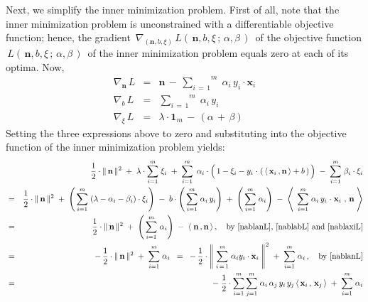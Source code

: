 Next, we simplify the inner minimization problem.
First of all, note that the inner minimization problem is unconstrained
with a differentiable objective function; hence, the gradient 
\,$\nabla_{(\mathbf{n},b,\xi)}\,L(\,\mathbf{n},b,\xi\,;\,\alpha,\beta\,)$\,
of the objective function
\,$L(\,\mathbf{n},b,\xi\,;\,\alpha,\beta\,)$\,
of the inner minimization problem equals zero at each of its optima.
Now,
\begin{eqnarray}
\label{nablanL}
\nabla_{\mathbf{n}}\,L
& = &
	\mathbf{n} \, - \, \overset{m}{\underset{i\,=\,1}{\sum}}\;\alpha_{i}\,y_{i}\cdot\mathbf{x}_{i}
\\
\label{nablabL}
\nabla_{b}\,L
& = &
	\overset{m}{\underset{i\,=\,1}{\sum}}\;\alpha_{i}\,y_{i}
\\
\label{nablaxiL}
\nabla_{\xi}\,L
& = &
	\lambda\cdot\mathbf{1}_{m} \, - \, (\alpha \, + \, \beta)
\end{eqnarray}
Setting the three expressions above to zero and
substituting into the objective function of the inner minimization problem yields:
\begin{eqnarray*}
&&
	\dfrac{1}{2}\cdot\Vert\,\mathbf{n}\,\Vert^{2}
	\; + \;
	\lambda\cdot\overset{m}{\underset{i=1}{\sum}}\;\xi_{i}
	\; + \;
	\overset{m}{\underset{i = 1}{\sum}}\;\,
		\alpha_{i}
		\cdot
		\left(\,
			1 - \xi_{i}
			-
			y_{i}\overset{{\color{white}1}}{\cdot}\left(\,
				\langle\,\mathbf{x}_{i}\,,\mathbf{n}\,\rangle + b
				\,\right)
			\,\right)
	\; - \;
	\overset{m}{\underset{i = 1}{\sum}}\;
		\beta_{i}
		\cdot
		\xi_{i}
\\
& = &
	\dfrac{1}{2}\cdot\Vert\,\mathbf{n}\,\Vert^{2}
	\; + \;
	\left(\,\overset{m}{\underset{i=1}{\sum}}\;(\lambda-\alpha_{i}-\beta_{i})\cdot\xi_{i}\right)
	\; - \;
	b\cdot\left(\,\overset{m}{\underset{i = 1}{\sum}}\;\alpha_{i}\,y_{i}\right)
	\; + \;
	\left(\,\overset{m}{\underset{i = 1}{\sum}}\;\alpha_{i}\right)
	\; - \;
	\left\langle\;\,
		\overset{m}{\underset{i = 1}{\sum}}\;
			\alpha_{i}\,y_{i}\overset{{\color{white}1}}{\cdot}
					\mathbf{x}_{i}\,
		\,,\,
		\mathbf{n}
		\;\right\rangle
\\
& = &
	\dfrac{1}{2}\cdot\Vert\,\mathbf{n}\,\Vert^{2}
	\; + \;
	\left(\,\overset{m}{\underset{i = 1}{\sum}}\;\alpha_{i}\right)
	\; - \;
	\left\langle\; \mathbf{n}\,,\mathbf{n} \,\right\rangle,
	\quad\textnormal{by \eqref{nablanL}, \eqref{nablabL} and \eqref{nablaxiL}}
\\
& = &
	-\,
	\dfrac{1}{2}\cdot\Vert\,\mathbf{n}\,\Vert^{2}
	\; + \;
	\overset{m}{\underset{i = 1}{\sum}}\;\alpha_{i}
\;\; = \;\;
	-\,
	\dfrac{1}{2}\cdot\left\Vert\;
		\overset{m}{\underset{i\,=\,1}{\sum}}\;\alpha_{i}y_{i}\cdot\mathbf{x}_{i}
		\;\right\Vert^{2}
	\; + \;
	\overset{m}{\underset{i = 1}{\sum}}\;\alpha_{i}\,,
	\quad\textnormal{by \eqref{nablanL}}
\\
& = &
	-\;\dfrac{1}{2}\cdot
	\overset{m}{\underset{i=1}{\sum}}\,
	\overset{m}{\underset{j=1}{\sum}}\;
	\alpha_{i}\,\alpha_{j}\,y_{i}\,y_{j}\,\langle\,\mathbf{x}_{i}\,,\,\mathbf{x}_{j}\,\rangle
	\; + \;
	\overset{m}{\underset{i = 1}{\sum}}\;\alpha_{i}
\end{eqnarray*}
